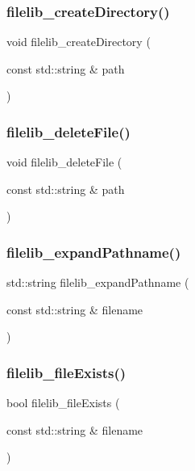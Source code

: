 \subsubsection{\texorpdfstring{filelib\+\_\+create\+Directory()}{filelib\_createDirectory()}}
{\footnotesize\ttfamily void filelib\+\_\+create\+Directory (\begin{DoxyParamCaption}\item[{const std\+::string \&}]{path }\end{DoxyParamCaption})}

\mbox{\label{namespaceplatform_a50db655854102498e7bbc1d5f409a29f}} 
\subsubsection{\texorpdfstring{filelib\+\_\+delete\+File()}{filelib\_deleteFile()}}
{\footnotesize\ttfamily void filelib\+\_\+delete\+File (\begin{DoxyParamCaption}\item[{const std\+::string \&}]{path }\end{DoxyParamCaption})}

\mbox{\label{namespaceplatform_a7aec69b6d9120eefca74eeba8f7eb02d}} 
\subsubsection{\texorpdfstring{filelib\+\_\+expand\+Pathname()}{filelib\_expandPathname()}}
{\footnotesize\ttfamily std\+::string filelib\+\_\+expand\+Pathname (\begin{DoxyParamCaption}\item[{const std\+::string \&}]{filename }\end{DoxyParamCaption})}

\mbox{\label{namespaceplatform_a7ac56ce70edb176e3d75d83732517d85}} 
\subsubsection{\texorpdfstring{filelib\+\_\+file\+Exists()}{filelib\_fileExists()}}
{\footnotesize\ttfamily bool filelib\+\_\+file\+Exists (\begin{DoxyParamCaption}\item[{const std\+::string \&}]{filename }\end{DoxyParamCaption})}

